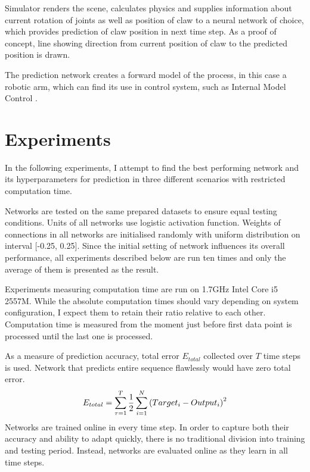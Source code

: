\documentclass[12pt,oneside]{fithesis2}
\begin{document}
Simulator renders the scene, calculates physics and supplies information about current rotation of joints as well as position of claw to a neural network of choice, which provides prediction of claw position in next time step. As a proof of concept, line showing direction from current position of claw to the predicted position is drawn.\par
The prediction network creates a forward model of the process, in this case a robotic arm, which can find its use in control system, such as Internal Model Control \cite{internal-model-control}.

\chapter{Experiments}
In the following experiments, I attempt to find the best performing network and its hyperparameters for prediction in three different scenarios with restricted computation time.\par

Networks are tested on the same prepared datasets to ensure equal testing conditions. Units of all networks use logistic activation function. Weights of connections in all networks are initialised randomly with uniform distribution on interval [-0.25, 0.25]. Since the initial setting of network influences its overall performance, all experiments described below are run ten times and only the average of them is presented as the result.\par

Experiments measuring computation time are run on 1.7GHz Intel Core i5 2557M. While the absolute computation times should vary depending on system configuration, I expect them to retain their ratio relative to each other. Computation time is measured from the moment just before first data point is processed until the last one is processed.\par

As a measure of prediction accuracy, total error $E_{total}$ collected over $T$ time steps is used. Network that predicts entire sequence flawlessly would have zero total error. %
$$E_{total} = \sum\limits_{\tau = 1}^T {1 \over 2} \sum\limits_{i=1}^{N}\left(Target_i - Output_i\right)^2$$
Networks are trained online in every time step. In order to capture both their accuracy and ability to adapt quickly, there is no traditional division into training and testing period. Instead, networks are evaluated online as they learn in all time steps. \par
\end{document}
